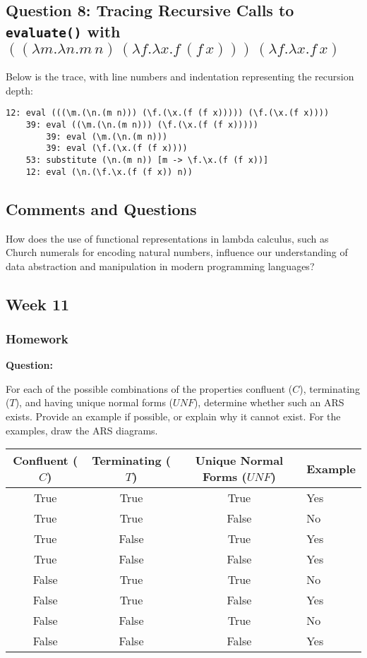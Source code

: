 \documentclass{article}
\theoremstyle{theorem}
\theoremstyle{definition}
\theoremstyle{remark}
\begin{document}
{\subsection*{Question 8: Tracing Recursive Calls to \texttt{evaluate()} with \( ((\lambda m.\lambda n.m \, n) \, (\lambda f.\lambda x.f \, (f \, x))) \, (\lambda f.\lambda x.f \, x) \)}
Below is the trace, with line numbers and indentation representing the recursion depth:
\begin{verbatim}
12: eval (((\m.(\n.(m n))) (\f.(\x.(f (f x))))) (\f.(\x.(f x))))
    39: eval ((\m.(\n.(m n))) (\f.(\x.(f (f x)))))
        39: eval (\m.(\n.(m n)))
        39: eval (\f.(\x.(f (f x))))
    53: substitute (\n.(m n)) [m -> \f.\x.(f (f x))]
    12: eval (\n.(\f.\x.(f (f x)) n))
\end{verbatim}

\subsection*{Comments and Questions}
How does the use of functional representations in lambda calculus, such as Church numerals for encoding natural numbers, influence our understanding of data abstraction and manipulation in modern programming languages?


\subsection{Week 11}

  \subsubsection*{Homework}
  \textbf{Question:}

  For each of the possible combinations of the properties confluent (\( C \)), terminating (\( T \)), and having unique normal forms (\( UNF \)), determine whether such an ARS exists. Provide an example if possible, or explain why it cannot exist. For the examples, draw the ARS diagrams.

  \begin{center}
    \begin{tabular}{|c|c|c|l|}
      \hline
      Confluent (\( C \)) & Terminating (\( T \)) & Unique Normal Forms (\( UNF \)) & Example \\
      \hline
      True & True & True & Yes \\
      True & True & False & No \\
      True & False & True & Yes \\
      True & False & False & Yes \\
      False & True & True & No \\
      False & True & False & Yes \\
      False & False & True & No \\
      False & False & False & Yes \\
      \hline
    \end{tabular}
  \end{center}

}
\end{document}
